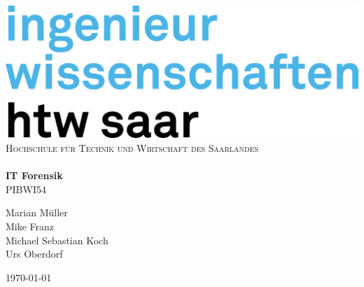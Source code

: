 \begin{titlepage}
\begin{center}

\includegraphics[scale=1]{graphics/htw_Logo_inwi_CO.png}\\[1cm]

\textsc{\LARGE Hochschule für Technik und Wirtschaft des Saarlandes}\\[1.5cm]


\hrulefill \\[0.4cm]
{ \huge \bfseries IT Forensik \\[0.4cm] }
\textsc{PIBWI54}\\[0.5cm]
\hrulefill
\noindent


Marian Müller \\
Mike Franz \\
Michael Sebastian Koch \\
Urs Oberdorf \\


\vfill
\begin{center}
{\large \today}
\end{center}
\end{center}
\end{titlepage}